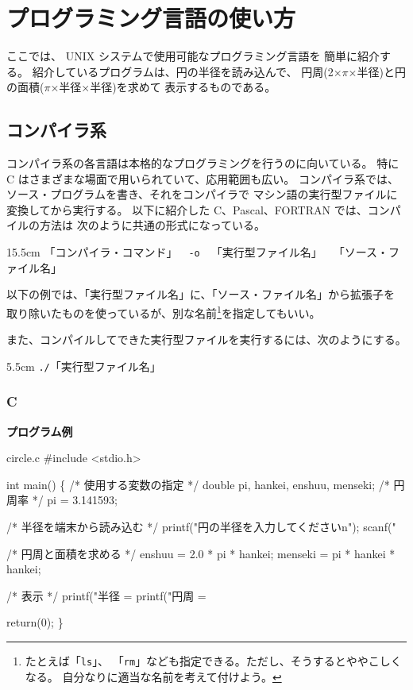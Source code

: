 \chapter{プログラミング言語の使い方}

ここでは、 UNIX システムで使用可能なプログラミング言語を
簡単に紹介する。
紹介しているプログラムは、円の半径を読み込んで、
円周(2×$\pi$×半径)と円の面積($\pi$×半径×半径)を求めて
表示するものである。

\section{コンパイラ系}

コンパイラ系の各言語は本格的なプログラミングを行うのに向いている。
特に C はさまざまな場面で用いられていて、応用範囲も広い。
コンパイラ系では、ソース・プログラムを書き、それをコンパイラで
マシン語の実行型ファイルに変換してから実行する。
以下に紹介した C、Pascal、FORTRAN では、コンパイルの方法は
次のように共通の形式になっている。

\begin{coml}{15.5cm}
{\large 「コンパイラ・コマンド」~~\texttt{-o}~~「実行型ファイル名」~~「ソース・ファイル名」}
\end{coml}

以下の例では、「実行型ファイル名」に、「ソース・ファイル名」から拡張子を
取り除いたものを使っているが、別な名前\footnote{たとえば「\texttt{ls}」、
「\texttt{rm}」なども指定できる。ただし、そうするとややこしくなる。
自分なりに適当な名前を考えて付けよう。}を指定してもいい。

また、コンパイルしてできた実行型ファイルを実行するには、次のようにする。

\begin{coml}{5.5cm}
{\large \texttt{./}「実行型ファイル名」}
\end{coml}

\subsection{C}

\noindent
\textbf{プログラム例}

\begin{progls2}{circle.c}
#include <stdio.h>

int main()
\{
  /* 使用する変数の指定 */
  double pi, hankei, enshuu, menseki;
  /* 円周率 */
  pi = 3.141593;
\end{progls2}
\begin{progls2}{}
  /* 半径を端末から読み込む */
  printf("円の半径を入力してください{\bcsl}n");
  scanf("%

  /* 円周と面積を求める */
  enshuu = 2.0 * pi * hankei;
  menseki = pi * hankei * hankei;

  /* 表示 */
  printf("半径 = %
  printf("円周 = %

  return(0);
\}
\end{progls2}

